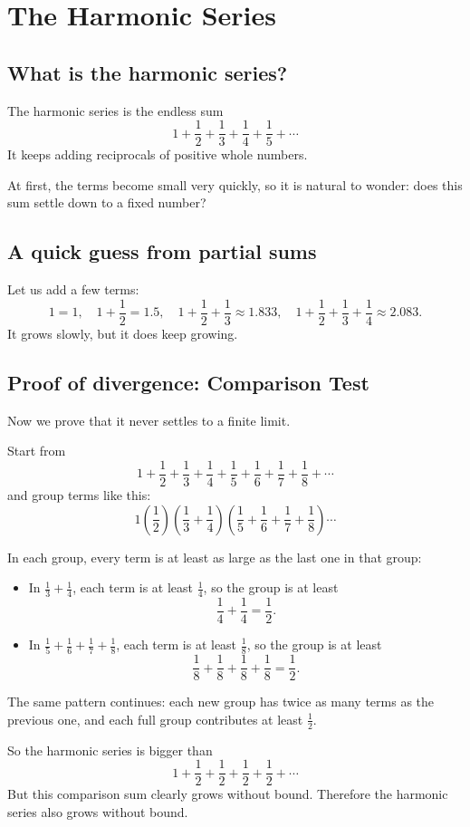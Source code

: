 \chapter{The Harmonic Series}

\section{What is the harmonic series?}
The harmonic series is the endless sum
\[
1+\frac12+\frac13+\frac14+\frac15+\cdots
\]
It keeps adding reciprocals of positive whole numbers.

At first, the terms become small very quickly, so it is natural to wonder:
does this sum settle down to a fixed number?

\section{A quick guess from partial sums}
Let us add a few terms:
\[
1=1,\quad
1+\frac12=1.5,\quad
1+\frac12+\frac13\approx1.833,\quad
1+\frac12+\frac13+\frac14\approx2.083.
\]
It grows slowly, but it does keep growing.

\section{Proof of divergence: Comparison Test}
Now we prove that it never settles to a finite limit.

Start from
\[
1+\frac12+\frac13+\frac14+\frac15+\frac16+\frac17+\frac18+\cdots
\]
and group terms like this:
\[
1
\left(\frac12\right)
\left(\frac13+\frac14\right)
\left(\frac15+\frac16+\frac17+\frac18\right)
\cdots
\]

In each group, every term is at least as large as the last one in that group:
\begin{itemize}
  \item In \(\frac13+\frac14\), each term is at least \(\frac14\), so the group is at least
  \[
  \frac14+\frac14=\frac12.
  \]
  \item In \(\frac15+\frac16+\frac17+\frac18\), each term is at least \(\frac18\), so the group is at least
  \[
  \frac18+\frac18+\frac18+\frac18=\frac12.
  \]
\end{itemize}

The same pattern continues: each new group has twice as many terms as the previous
one, and each full group contributes at least \(\frac12\).

So the harmonic series is bigger than
\[
1+\frac12+\frac12+\frac12+\frac12+\cdots
\]
But this comparison sum clearly grows without bound. Therefore the harmonic
series also grows without bound.

